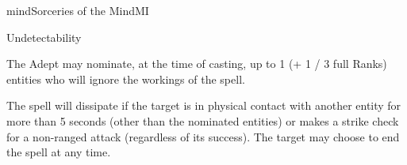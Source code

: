 \begin{college}[1.6]{mind}{Sorceries of the Mind}{MI}
\begin{spell}[S-11]{Undetectability}
\begin{effects}
The Adept may nominate, at the time of casting, up to 1 (+ 1 / 3 full
Ranks) entities who will ignore the workings of the spell.

The spell will dissipate if the target is in physical contact with
another entity for more than 5 seconds (other than the nominated
entities) or makes a strike check for a non-ranged attack (regardless
of its success). The target may choose to end the spell at any time.
\end{effects}
\end{spell}
\end{college}
